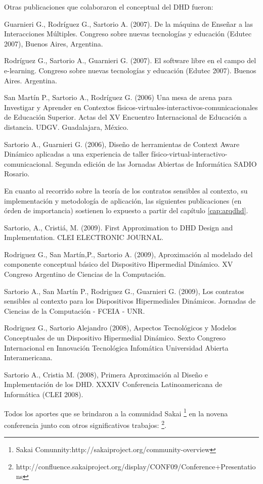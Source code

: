 {Otras publicaciones que colaboraron el conceptual del DHD fueron:

Guarnieri G., Rodríguez G., Sartorio A. (2007). De la máquina de Enseñar
a las Interacciones Múltiples. Congreso sobre nuevas tecnologías y educación
(Edutec 2007), Buenos Aires, Argentina.

Rodríguez G., Sartorio A., Guarnieri G. (2007). El software libre en el
campo del e-learning. Congreso sobre nuevas tecnologías y educación (Edutec
2007). Buenos Aires. Argentina.

San Martín P., Sartorio A., Rodríguez G. (2006) Una mesa de arena para
Investigar y Aprender en Contextos físicos-virtuales-interactivos-comunicacionales de Educación Superior. Actas del
XV Encuentro Internacional de Educación a distancia. UDGV. Guadalajara, México.

Sartorio A., Guarnieri G. (2006), Diseño de herramientas de Context
Aware Dinámico aplicadas a una experiencia de taller físico-virtual-interactivo-comunicacional. Segunda edición de las
Jornadas Abiertas de Informática SADIO Rosario.

En cuanto al recorrido sobre la teoría de los contratos sensibles al contexto,
su implementación y metodología de aplicación, las siguientes
publicaciones (en órden de importancia) sostienen lo expuesto a
partir del capítulo \ref{cap:arqdhd}.

Sartorio, A., Cristiá, M. (2009). First Approximation to
DHD Design and Implementation. CLEI ELECTRONIC JOURNAL.

Rodriguez G., San Martín,P., Sartorio A. (2009),
Aproximación al modelado del componente conceptual básico del Dispositivo
Hipermedial Dinámico. XV Congreso Argentino de Ciencias de la Computación.  

Sartorio A., San Martín P.,  Rodriguez G., Guarnieri
G. (2009),  Los contratos sensibles al contexto para los Dispositivos
Hipermediales Dinámicos. Jornadas de Ciencias de la Computación - FCEIA - UNR.

Rodriguez G., Sartorio Alejandro (2008),  Aspectos Tecnológicos y Modelos
Conceptuales de un Dispositivo Hipermedial Dinámico. Sexto Congreso
Internacional en Innovación Tecnológica Infomática Universidad Abierta
Interamericana.

Sartorio A., Cristia M. (2008),  Primera Aproximación al Diseño
e Implementación de los DHD.   XXXIV Conferencia Latinoamericana de Informática
(CLEI 2008).


Todos los aportes que se brindaron a la comunidad Sakai \footnote{Sakai
Comunnity:http://sakaiproject.org/community-overview} en la novena conferencia
junto con otros significativos trabajos:
\footnote{
http://confluence.sakaiproject.org/display/CONF09/Conference+Presentations}. 

}
